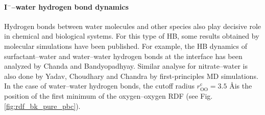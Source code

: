 \FloatBarrier

\paragraph{I$^-$--water hydrogen bond dynamics}\label{PARAGRAPH_I--W}
Hydrogen bonds between water molecules and other species also play decisive role in chemical and biological systems. 
For this type of HB, some results obtained by molecular simulations have been published. For example,
the HB dynamics of surfactant--water and water--water hydrogen bonds at the interface has been analyzed by Chanda 
and Bandyopadhyay.\cite{Chanda2006} 
Similar analyse for nitrate--water is also done by Yadav, Choudhary and Chandra by first-principles MD simulations.\cite{Yadav2017} 
In the case of water--water hydrogen bonds, the cutoff radius $r_\text{OO}^{\text{c}}=3.5$ \AA is the position of the first minimum of the oxygen--oxygen RDF 
(see Fig.\thinspace\ref{fig:rdf_bk_pure_pbc}).

